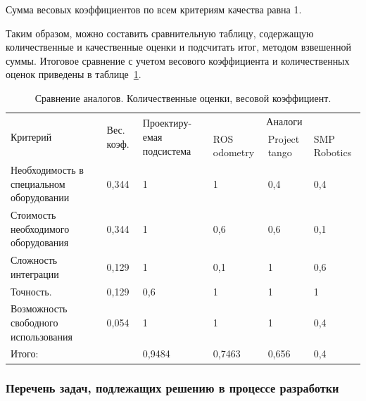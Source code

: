 
Сумма весовых коэффициентов по всем критериям качества равна 1.

Таким образом, можно составить сравнительную таблицу, содержащую количественные и качественные оценки и подсчитать итог, методом взвешенной суммы.
Итоговое сравнение с учетом весового коэффициента и количественных оценок приведены в таблице~\ref{tab:srav_ves}.

\begin{table}[!Htb]
	\caption{Сравнение аналогов. Количественные оценки, весовой коэффициент.}\label{tab:srav_ves}
    \centering
	\begin{tabular}{|p{4cm}|p{2cm}|p{}|p{2cm}|p{2cm}|p{2cm}|}
	\hline 
	\multirow{2}{4cm}{Критерий} & \multirow{2}{2cm}{Вес. коэф. } & \multirow{2}{2,5cm}{Проектиру-емая подсистема} & 	\multicolumn{3}{c|}{Аналоги}\\ 
	\cline{4-6}
	 &  &   & ROS odometry & Project tango & SMP Robotics \\ 
	\hline 
	Необходимость в специальном оборудовании & 0,344 & 1 & 1 & 0,4 & 0,4 \\ 
	\hline 
	Стоимость необходимого оборудования & 0,344 & 1 & 0,6 & 0,6 & 0,1 \\ 	
	\hline 
	Сложность интеграции & 0,129 & 1 & 0,1 & 1 & 0,6 \\
	\hline 
	Точность. & 0,129 & 0,6 & 1 & 1 & 1 \\ 
	\hline 
	Возможность свободного использования & 0,054 & 1 & 1 & 1 & 0,4 \\ 
	\hline 
	Итого: &  & 0,9484 & 0,7463 & 0,656 & 0,4 \\ 
	\hline 
	\end{tabular}
\end{table} 


\subsubsection{Перечень задач, подлежащих решению в процессе разработки}

